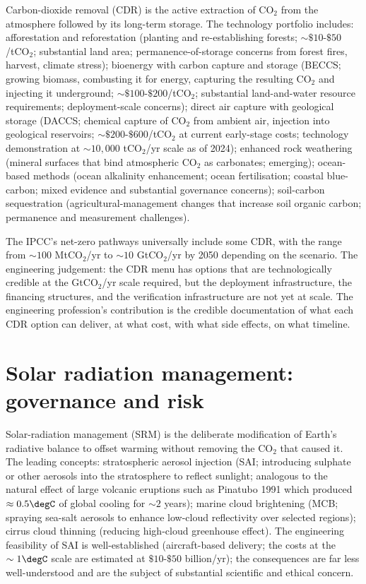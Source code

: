 Carbon-dioxide removal (CDR) is the active extraction of CO$_2$ from the atmosphere followed by its long-term storage. The technology portfolio includes: afforestation and reforestation (planting and re-establishing forests; $\sim \$10$-$\$50$/tCO$_2$; substantial land area; permanence-of-storage concerns from forest fires, harvest, climate stress); bioenergy with carbon capture and storage (BECCS; growing biomass, combusting it for energy, capturing the resulting CO$_2$ and injecting it underground; $\sim \$100$-$\$200$/tCO$_2$; substantial land-and-water resource requirements; deployment-scale concerns); direct air capture with geological storage (DACCS; chemical capture of CO$_2$ from ambient air, injection into geological reservoirs; $\sim \$200$-$\$600$/tCO$_2$ at current early-stage costs; technology demonstration at $\sim 10{,}000$ tCO$_2$/yr scale as of 2024); enhanced rock weathering (mineral surfaces that bind atmospheric CO$_2$ as carbonates; emerging); ocean-based methods (ocean alkalinity enhancement; ocean fertilisation; coastal blue-carbon; mixed evidence and substantial governance concerns); soil-carbon sequestration (agricultural-management changes that increase soil organic carbon; permanence and measurement challenges).

The IPCC's net-zero pathways universally include some CDR, with the range from $\sim 100$ MtCO$_2$/yr to $\sim 10$ GtCO$_2$/yr by 2050 depending on the scenario. The engineering judgement: the CDR menu has options that are technologically credible at the GtCO$_2$/yr scale required, but the deployment infrastructure, the financing structures, and the verification infrastructure are not yet at scale. The engineering profession's contribution is the credible documentation of what each CDR option can deliver, at what cost, with what side effects, on what timeline.

\section{Solar radiation management: governance and risk}

Solar-radiation management (SRM) is the deliberate modification of Earth's radiative balance to offset warming without removing the CO$_2$ that caused it. The leading concepts: stratospheric aerosol injection (SAI; introducing sulphate or other aerosols into the stratosphere to reflect sunlight; analogous to the natural effect of large volcanic eruptions such as Pinatubo 1991 which produced $\approx 0.5\degC$ of global cooling for $\sim 2$ years); marine cloud brightening (MCB; spraying sea-salt aerosols to enhance low-cloud reflectivity over selected regions); cirrus cloud thinning (reducing high-cloud greenhouse effect). The engineering feasibility of SAI is well-established (aircraft-based delivery; the costs at the $\sim 1\degC$ scale are estimated at $\$10$-$\$50$ billion/yr); the consequences are far less well-understood and are the subject of substantial scientific and ethical concern.


